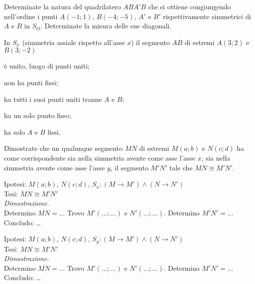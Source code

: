 \begin{esercizio}
	\label{ese:8.15}
	Determinate la natura del quadrilatero $ABA'B$ che si ottiene 
	congiungendo nell'ordine i punti $A(-1;1)$, $B(-4;-5)$, $A'$ e $B'$ 
	rispettivamente simmetrici di $A$ e $B$ in $S_O$. Determinate la 
	misura delle sue diagonali.
\end{esercizio}

\begin{esercizio}
	\label{ese:8.27}
	In $S_x$ (simmetria assiale rispetto all'asse $x$) il segmento $AB$ 
	di estremi $A(3;2)$ e $B(3;-2)$
	\begin{enumeratea}
		\item è unito, luogo di punti uniti;
		\item non ha punti fissi;
		\item ha tutti i suoi punti uniti tranne $A$ e $B$;
		\item ha un solo punto fisso;
		\item ha solo $A$ e $B$ fissi.
	\end{enumeratea}
\end{esercizio}

\begin{esercizio}
	\label{ese:8.28}
	Dimostrate che un qualunque segmento $MN$ di estremi $M(a;b)$ e 
	$N(c;d)$ ha come corrispondente sia nella simmetria avente come asse 
	l'asse $x$, sia nella simmetria avente come asse l'asse $y$, il 
	segmento $M'N'$ tale che $MN\cong M'N'$.\vspace{5pt}
	
	\noindent Ipotesi: $M(a;b)$, $N(c;d)$, $S_x:(M\rightarrow M') \wedge 
	(N\rightarrow N')$\\
	Tesi: $MN\cong M'N'$\vspace{3pt}\\
	\emph{Dimostrazione.}\\
	Determino $\overline{MN}=\ldots{}$ Trovo $M'(\ldots{};\ldots{})$ e 
	$N'(\ldots{};\ldots{})$. Determino $\overline{M'N'}=\ldots{}$\\
	Concludo: \ldots{}\vspace{5pt}
	
	\noindent Ipotesi: $M(a;b)$, $N(c;d)$, $S_y:(M\rightarrow M') \wedge 
	(N\rightarrow N')$\\
	Tesi: $MN\cong M'N'$\vspace{3pt}\\
	\emph{Dimostrazione.}\\
	Determino $\overline{MN}=\ldots{}$ Trovo $M'(\ldots{};\ldots{})$ e 
	$N'(\ldots{};\ldots{})$. Determino $\overline{M'N'}=\ldots{}$\\
	Concludo: \ldots{}
\end{esercizio}

